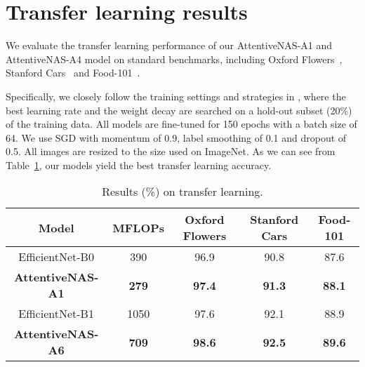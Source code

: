 \documentclass[final]{cvpr}
\theoremstyle{definition}
\begin{document}
\section{Transfer learning results}
\label{app:transfer_learning}

We evaluate the transfer learning performance of our AttentiveNAS-A1 and AttentiveNAS-A4 model on standard benchmarks, 
including Oxford Flowers~\cite{nilsback2008automated}, Stanford Cars~\cite{krause2013collecting} and Food-101~\cite{bossard2014food}.

Specifically, we closely follow the training settings and strategies in \cite{huang2018gpipe}, 
where the best learning rate and the weight decay are searched on a hold-out subset (20\%) of the training data.
All models are fine-tuned for 150 epochs with a batch size of 64.
We use SGD with momentum of 0.9, label smoothing of 0.1 and dropout of 0.5. 
All images are resized to the size used on ImageNet.
As we can see from Table~\ref{tab:transfer_learning}, our models yield the best transfer learning accuracy. 

\begin{table}[ht]
    \centering
    \begin{tabular}{c|c|ccc}
    \hline 
    Model & MFLOPs & Oxford Flowers & Stanford Cars & Food-101 \\ 
    \hline
    EfficientNet-B0 & 390 &  96.9 & 90.8 & 87.6 \\
    \bf AttentiveNAS-A1 & \bf 279 & \bf 97.4 & \bf 91.3 & \bf 88.1 \\
    \hline
    EfficientNet-B1 & 1050 &  97.6 & 92.1 & 88.9 \\
    \bf AttentiveNAS-A6 & \bf 709 & \bf 98.6 & \bf 92.5 & \bf 89.6 \\
    \hline
    \end{tabular}
    \caption{Results (\%) on transfer learning. }
    \label{tab:transfer_learning}
\end{table} 
\end{document}
